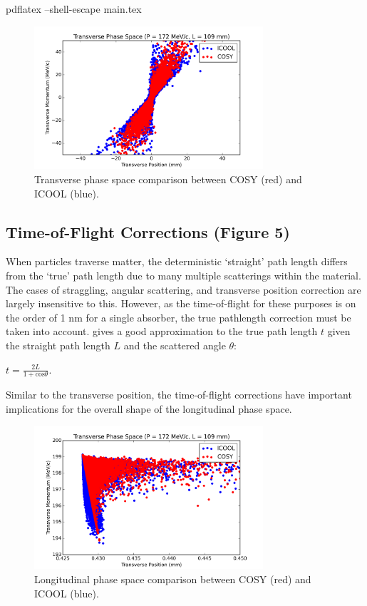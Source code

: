 \documentclass{jacow}
\begin{document}
pdflatex --shell-escape main.tex

\begin{figure}[h!]
\centering
\includegraphics*[width=85mm]{Figures/figure4}
\caption{Transverse phase space comparison between COSY (red) and ICOOL (blue).}
\end{figure}


\subsection{Time-of-Flight Corrections (Figure 5)}
When particles traverse matter, the deterministic `straight' path length differs from the `true' path length due to many multiple scatterings within the material. The cases of straggling, angular scattering, and transverse position correction are largely insensitive to this. However, as the time-of-flight for these purposes is on the order of 1 nm for a single absorber, the true pathlength correction must be taken into account. \cite{Bielajew} gives a good approximation to the true path length $t$ given the straight path length $L$ and the scattered angle $\theta$:
\begin{center} $t = \frac{2L}{1+\text{cos}\theta}.$\end{center}
Similar to the transverse position, the time-of-flight corrections have important implications for the overall shape of the longitudinal phase space.

\begin{figure}[h!]
\centering
\includegraphics*[width=85mm]{Figures/figure5}
\caption{Longitudinal phase space comparison between COSY (red) and ICOOL (blue).}
\end{figure}
\end{document}
